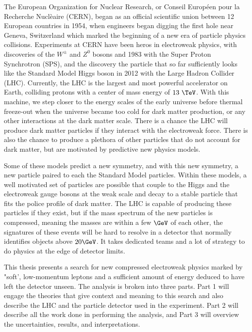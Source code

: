 The European Organization for Nuclear Research, or Conseil Europ\'een pour la Recherche Nucl\`eaire (CERN), began as an official scientific union between 12 European countries in 1954, when engineers began digging the first hole near Geneva, Switzerland which marked the beginning of a new era of particle physics collisions.  Experiments at CERN have been heros in electroweak physics, with discoveries of the $W^\pm$ and $Z^0$ bosons and 1983 with the Super Proton Synchrotron (SPS), and the discovery the particle that so far sufficiently looks like the Standard Model Higgs boson in 2012 with the Large Hadron Collider (LHC).  Currently, the LHC is the largest and most powerful accelerator on Earth, colliding protons with a center of mass energy of $13~\TeV$.  With this machine, we step closer to the energy scales of the early universe before thermal freeze-out when the universe became too cold for dark matter production, or any other interactions at the dark matter scale.  There is a chance the LHC will produce dark matter particles if they interact with the electroweak force.  There is also the chance to produce a plethora of other particles that do not account for dark matter, but are motivated by predictive new physics models. 

Some of these models predict a new symmetry, and with this new symmetry, a new particle paired to each the Standard Model particles.  Within these models, a well motivated set of particles are possible that couple to the Higgs and the electroweak gauge bosons at the weak scale and decay to a stable particle that fits the police profile of dark matter.  The LHC is capable of producing these particles if they exist, but if the mass spectrum of the new particles is compressed, meaning the masses are within a few $\GeV$ of each other, the signatures of these events will be hard to resolve in a detector that normally identifies objects above $20 \GeV$.  It takes dedicated teams and a lot of strategy to do physics at the edge of detector limits.  

This thesis presents a search for new compressed electroweak physics marked by "soft', low-momentum leptons and a sufficient amount of energy deduced to have left the detector unseen.  The analysis is broken into three parts.  Part 1 will engage the theories that give context and meaning to this search and also describe the LHC and the particle detector used in the experiment.  Part 2 will describe all the work done in performing the analysis, and Part 3 will overview the uncertainties, results, and interpretations.








